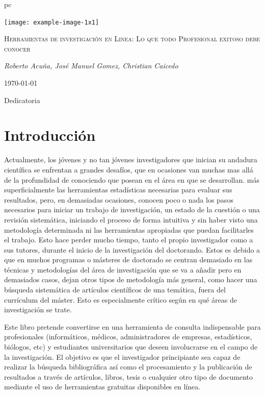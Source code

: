 pc\documentclass[a4paper,12pt,openany]{book}
\begin{document}
\begin{titlepage}
   \null\vfill
\thispagestyle{empty} 
	\centering
	\texttt{[image: example-image-1x1]}\par	\vspace{1cm}
   \centering
	{\scshape\LARGE Herramientas de investigación en Linea: Lo que todo Profesional exitoso debe conocer \par}
	\vspace{1cm}
	{\Large\itshape Roberto Acuña, José Manuel Gomez, Christian Caicedo\par}
	\vfill
	{\large \today\par}
\end{titlepage}
 
Dedicatoria
\tableofcontents
\chapter{Introducción}
Actualmente, los jóvenes y no tan jóvenes investigadores que inician su andadura científica se enfrentan a grandes desafíos, que en ocasiones van muchas mas allá de la profundidad de conociendo que posean en el área en que se desarrollan. más superficialmente las herramientas estadísticas necesarias para evaluar sus resultados, pero, en demasiadas ocasiones, conocen poco o nada los pasos necesarios para iniciar un trabajo de investigación, un estado de la cuestión o una revisión sistemática, iniciando el proceso de forma intuitiva y sin haber visto una metodología determinada ni las herramientas apropiadas que puedan facilitarles el trabajo. Esto hace perder mucho tiempo, tanto el propio investigador como a sus tutores, durante el inicio de la investigación del doctorando. Estos es debido a que en muchos programas o másteres de doctorado se centran demasiado en las técnicas y metodologías del área de investigación que se va a añadir pero en demasiados casos, dejan otros tipos de metodología más general, como hacer una búsqueda sistemática de artículos científicos de una temática, fuera del currículum del máster. Esto es especialmente crítico según en qué áreas de investigación se trate.

Este libro pretende convertirse en una herramienta de consulta indispensable para profesionales (informáticos, médicos, administradores de empresas, estadísticos, biólogos, etc) y estudiantes universitarios que deseen involucrarse en el campo de la investigación. El objetivo es que el investigador principiante sea capaz de realizar la búsqueda bibliográfica así como el procesamiento y la publicación de resultados a través de artículos, libros, tesis o cualquier otro tipo de documento mediante el uso de herramientas gratuitas disponibles en línea.
\end{document}
